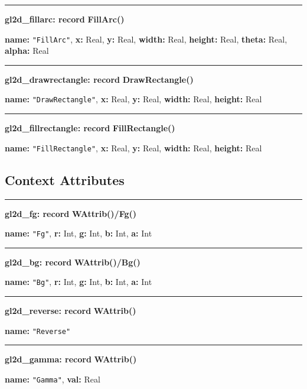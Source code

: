 \documentclass[letterpaper,12pt]{article}
\begin{document}
\bigskip\hrule\vspace{0.1cm}
\noindent
{\bf gl2d\_fillarc: record} \hfill {\bf FillArc()}

{\bf name:} \texttt{"FillArc"},\newline\indent
{\bf x:} Real,
{\bf y:} Real,
{\bf width:} Real,
{\bf height:} Real,
{\bf theta:} Real,
{\bf alpha:} Real

\bigskip\hrule\vspace{0.1cm}
\noindent
{\bf gl2d\_drawrectangle: record} \hfill {\bf DrawRectangle()}

{\bf name:} \texttt{"DrawRectangle"},\newline\indent
{\bf x:} Real,
{\bf y:} Real,
{\bf width:} Real,
{\bf height:} Real

\bigskip\hrule\vspace{0.1cm}
\noindent
{\bf gl2d\_fillrectangle: record} \hfill {\bf FillRectangle()}

{\bf name:} \texttt{"FillRectangle"},\newline\indent
{\bf x:} Real,
{\bf y:} Real,
{\bf width:} Real,
{\bf height:} Real

%
%
\subsection{Context Attributes}

\bigskip\hrule\vspace{0.1cm}
\noindent
{\bf gl2d\_fg: record} \hfill {\bf WAttrib()/Fg()}

{\bf name:} \texttt{"Fg"},\newline\indent
{\bf r:} Int,
{\bf g:} Int,
{\bf b:} Int,
{\bf a:} Int

\bigskip\hrule\vspace{0.1cm}
\noindent
{\bf gl2d\_bg: record} \hfill {\bf WAttrib()/Bg()}

{\bf name:} \texttt{"Bg"},\newline\indent
{\bf r:} Int,
{\bf g:} Int,
{\bf b:} Int,
{\bf a:} Int

\bigskip\hrule\vspace{0.1cm}
\noindent
{\bf gl2d\_reverse: record} \hfill {\bf WAttrib()}

{\bf name:} \texttt{"Reverse"}

\bigskip\hrule\vspace{0.1cm}
\noindent
{\bf gl2d\_gamma: record} \hfill {\bf WAttrib()}

{\bf name:} \texttt{"Gamma"},\newline\indent
{\bf val:} Real
\end{document}
